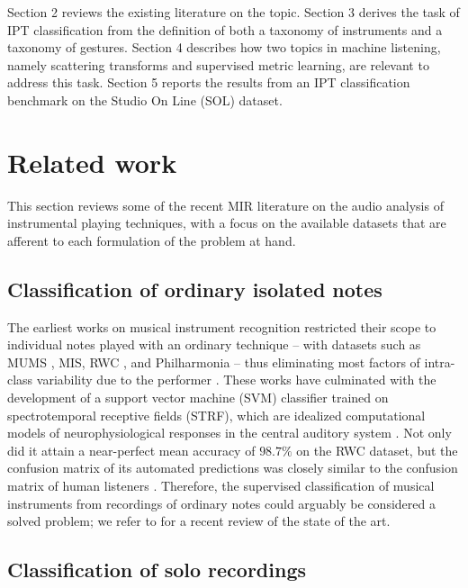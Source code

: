 \documentclass{article}
\begin{document}
Section 2 reviews the existing literature on the topic.
Section 3 derives the task of IPT classification from the definition of both a taxonomy of instruments and a taxonomy of gestures.
Section 4 describes how two topics in machine listening, namely scattering transforms and supervised metric learning, are relevant to address this task.
Section 5 reports the results from an IPT classification benchmark on the Studio On Line (SOL) dataset.


\section{Related work}
This section reviews some of the recent MIR literature on the audio analysis of instrumental playing techniques,
with a focus on the available datasets that are afferent to each formulation of the problem at hand.

\subsection{Classification of ordinary isolated notes}
The earliest works on musical instrument recognition restricted their scope to individual notes played with an ordinary technique -- with datasets such as MUMS \cite{opolko1989dataset}, MIS, RWC \cite{goto2003ismir}, and Philharmonia -- thus eliminating most factors of intra-class variability due to the performer  \cite{martin1998asa,brown1999jasa,eronen2000icassp,herrera2003jnmr,wieczorkowska2003jiis,kaminskyj2005jiis,benetos2006icassp}.
These works have culminated with the development of a support vector machine (SVM) classifier trained on spectrotemporal receptive fields (STRF), which are idealized computational models of neurophysiological responses in the central auditory system \cite{chi2005jasa}.
Not only did it attain a near-perfect mean accuracy of $98.7\%$ on the RWC dataset, but the confusion matrix of its automated predictions was closely similar to the confusion matrix of human listeners \cite{patil2012plos}.
Therefore, the supervised classification of musical instruments from recordings of ordinary notes could arguably be considered a solved problem; we refer to \cite{bhalke2016jiis} for a recent review of the state of the art.

\subsection{Classification of solo recordings}
\end{document}
